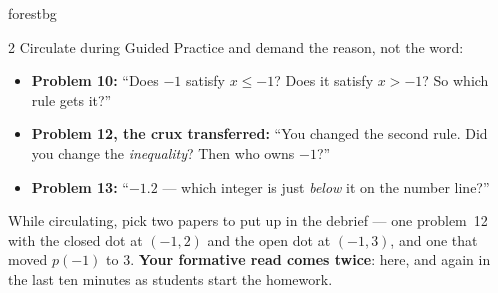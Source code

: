 \documentclass[10pt]{article}
\begin{document}
\begin{skillbox}{forestbg}
\begin{multicols}{2}
Circulate during Guided Practice and demand the reason, not the word:
\begin{itemize}[leftmargin=1.1em, nosep]
  \item \textbf{Problem 10:} ``Does $-1$ satisfy $x\le-1$? Does it satisfy $x>-1$? So which
        rule gets it?''
  \item \textbf{Problem 12, the crux transferred:} ``You changed the second rule. Did you change
        the \emph{inequality}? Then who owns $-1$?''
  \item \textbf{Problem 13:} ``$-1.2$ --- which integer is just \emph{below} it on the number
        line?''
\end{itemize}
While circulating, pick two papers to put up in the debrief --- one problem~12 with the closed
dot at $(-1,2)$ and the open dot at $(-1,3)$, and one that moved $p(-1)$ to $3$.
\textbf{Your formative read comes twice}: here, and again in the last ten minutes as students
start the homework.
\end{multicols}
\end{skillbox}
\end{document}
